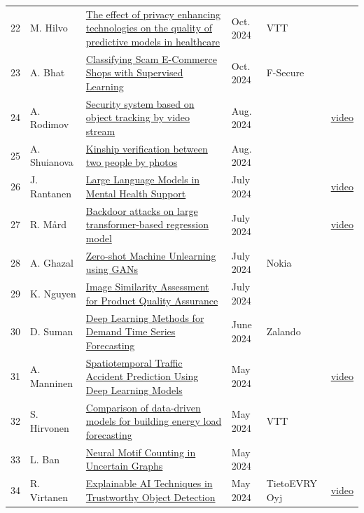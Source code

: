 \documentclass[11pt,a4paper]{article}
\begin{document}
\begin{longtable}{@{}r p{2.8cm} p{6.3cm} p{1.6cm} p{2cm} p{1.8cm}@{}}
22 & M. Hilvo & \href{https://urn.fi/URN:NBN:fi:aalto-202411217279}{The effect of privacy enhancing technologies on the quality of predictive models in healthcare} & Oct. 2024 & VTT &  \\
23 & A. Bhat & \href{https://urn.fi/URN:NBN:fi:aalto-202411207210}{Classifying Scam E-Commerce Shops with Supervised Learning} & Oct. 2024 & F-Secure &  \\
24 & A. Rodimov & \href{https://urn.fi/URN:NBN:fi:aalto-202408265859}{Security system based on object tracking by video stream} & Aug. 2024 &  & \href{https://youtu.be/E-n7yLNdv58}{video} \\
25 & A. Shuianova & \href{https://urn.fi/URN:NBN:fi:aalto-202408265860}{Kinship verification between two people by photos} & Aug. 2024 &  &  \\
26 & J. Rantanen & \href{https://urn.fi/URN:NBN:fi:aalto-202408255774}{Large Language Models in Mental Health Support} & July 2024 &  & \href{https://youtu.be/c5Z6CwWmr6w}{video} \\
27 & R. Mård & \href{https://urn.fi/URN:NBN:fi:aalto-202408255769}{Backdoor attacks on large transformer-based regression model} & July 2024 &  & \href{https://youtu.be/K2HcwgvErZw}{video} \\
28 & A. Ghazal & \href{https://urn.fi/URN:NBN:fi:aalto-202406305007}{Zero-shot Machine Unlearning using GANs} & July 2024 & Nokia &  \\
29 & K. Nguyen & \href{https://urn.fi/URN:NBN:fi:aalto-202408255659}{Image Similarity Assessment for Product Quality Assurance} & July 2024 &  &  \\
30 & D. Suman & \href{https://urn.fi/URN:NBN:fi:aalto-202406234851}{Deep Learning Methods for Demand Time Series Forecasting} & June 2024 & Zalando &  \\
31 & A. Manninen & \href{https://urn.fi/URN:NBN:fi:aalto-202406234904}{Spatiotemporal Traffic Accident Prediction Using Deep Learning Models} & May 2024 &  & \href{https://youtu.be/saahi0X6Di4}{video} \\
32 & S. Hirvonen & \href{https://urn.fi/URN:NBN:fi:aalto-202405263697}{Comparison of data-driven models for building energy load forecasting} & May 2024 & VTT &  \\
33 & L. Ban & \href{https://urn.fi/URN:NBN:fi:aalto-202405263699}{Neural Motif Counting in Uncertain Graphs} & May 2024 &  &  \\
34 & R. Virtanen & \href{https://urn.fi/URN:NBN:fi:aalto-202405263770}{Explainable AI Techniques in Trustworthy Object Detection} & May 2024 & TietoEVRY Oyj & \href{https://youtu.be/hyl5bJzA_1Y}{video} \\

\end{longtable}
\end{document}
